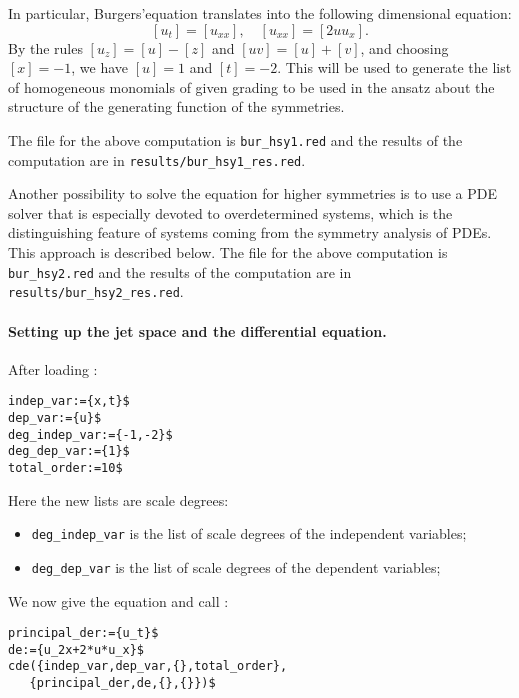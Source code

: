 In particular, Burgers'equation translates into the following dimensional
equation:
\[
  [u_t]=[u_{xx}],\quad [u_{xx}]=[2uu_x].
\]
By the rules $[u_z]=[u]-[z]$ and $[uv]=[u]+[v]$, and choosing $[x]=-1$, we have
$[u]=1$ and $[t]=-2$. This will be used to generate the list of homogeneous
monomials of given grading to be used in the ansatz about the structure of the
generating function of the symmetries.

The file for the above computation is
\texttt{bur\_hsy1.red} and the results of the computation are in
\texttt{results/bur\_hsy1\_res.red}.

Another possibility to solve the equation for higher symmetries is to use a
PDE solver that is especially devoted to overdetermined systems, which is the
distinguishing feature of systems coming from the symmetry analysis of PDEs.
This approach is described below. The file for the above computation is
\texttt{bur\_hsy2.red} and the results of the computation are in
\texttt{results/bur\_hsy2\_res.red}.


\paragraph*{Setting up the jet space and the differential equation.}
\label{cdesec:setting-up-jet}
After loading \cde:
\begin{verbatim}
indep_var:={x,t}$
dep_var:={u}$
deg_indep_var:={-1,-2}$
deg_dep_var:={1}$
total_order:=10$
\end{verbatim}
Here the new lists are scale degrees:
\begin{itemize}
\item \texttt{deg\_indep\_var} is the list of scale degrees of the independent
  variables;
\item \texttt{deg\_dep\_var} is the list of scale degrees of the dependent
  variables;
\end{itemize}

We now give the equation and call \cde:
\begin{verbatim}
principal_der:={u_t}$
de:={u_2x+2*u*u_x}$
cde({indep_var,dep_var,{},total_order},
   {principal_der,de,{},{}})$
\end{verbatim}

